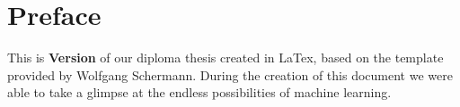 \chapter{Preface}


This is \textbf{Version \htldiplDate} of our diploma thesis created in LaTex, based on the template provided by Wolfgang Schermann.
During the creation of this document we were able to take a glimpse at the endless possibilities of machine learning.


